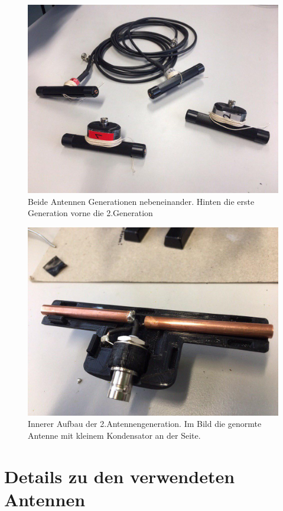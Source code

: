 \documentclass[titlepage,11pt,a4paper,ngerman]{article}
\begin{document}
\begin{figure}[h]
	\includegraphics[scale=0.3]{Bilder/Ant_12}
	\centering
	\caption{Beide Antennen Generationen nebeneinander. Hinten die erste Generation vorne die 2.Generation}
\end{figure}
\begin{figure}[h]
	\includegraphics[scale=0.3]{Bilder/Ant_innen_2}
	\centering
	\caption{Innerer Aufbau der 2.Antennengeneration. Im Bild die genormte Antenne mit kleinem Kondensator an der Seite.}
\end{figure}


\section{Details zu den verwendeten Antennen}
\end{document}
